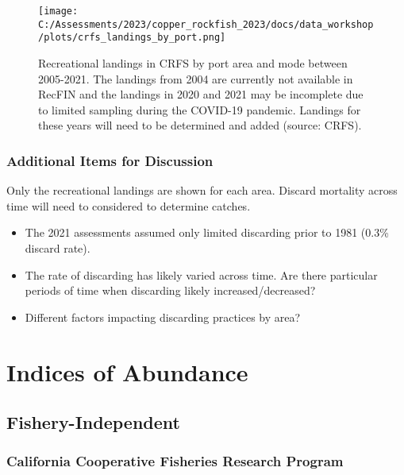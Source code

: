 \documentclass[
]{article}
\providecommand{\tightlist}{%
  \setlength{\itemsep}{0pt}\setlength{\parskip}{0pt}}
\begin{document}
\begin{figure}
\centering
\texttt{[image: C:/Assessments/2023/copper\_rockfish\_2023/docs/data\_workshop/plots/crfs\_landings\_by\_port.png]}
\caption{Recreational landings in CRFS by port area and mode between
2005-2021. The landings from 2004 are currently not available in RecFIN
and the landings in 2020 and 2021 may be incomplete due to limited
sampling during the COVID-19 pandemic. Landings for these years will
need to be determined and added (source:
CRFS).\label{fig:rec-port-mode}}
\end{figure}

\hypertarget{additional-items-for-discussion-1}{%
\subsubsection{Additional Items for
Discussion}\label{additional-items-for-discussion-1}}

Only the recreational landings are shown for each area. Discard
mortality across time will need to considered to determine catches.

\begin{itemize}
\tightlist
\item
  The 2021 assessments assumed only limited discarding prior to 1981
  (0.3\% discard rate).
\item
  The rate of discarding has likely varied across time. Are there
  particular periods of time when discarding likely increased/decreased?
\item
  Different factors impacting discarding practices by area?
\end{itemize}

\hypertarget{indices-of-abundance}{%
\section{Indices of Abundance}\label{indices-of-abundance}}

\hypertarget{fishery-independent}{%
\subsection{Fishery-Independent}\label{fishery-independent}}

\hypertarget{california-cooperative-fisheries-research-program}{%
\subsubsection{California Cooperative Fisheries Research
Program}\label{california-cooperative-fisheries-research-program}}
\end{document}
